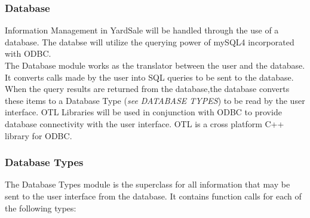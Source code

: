 \documentclass{report}
\begin{document}
            \subsubsection{Database}
                Information Management in YardSale will be handled
                through the use of a database.  The databse will
                utilize the querying power of mySQL4 incorporated
                with ODBC. \\
                The Database module works as the translator between
                the user and the database.  It converts calls
                made by the user into SQL queries to be sent to the
                database.  When the query results are returned from the
                database,the database converts these items to a
                Database Type ({\sl see DATABASE TYPES}) to be read by the
                user interface. OTL Libraries will be used in conjunction with ODBC to
                provide database connectivity with the user interface. OTL is
                a cross platform C++ library for ODBC.

            \subsubsection{Database Types}
                The Database Types module is the superclass for all information that
                may be sent to the user interface from the database.  It contains
                function calls for each of the following types:
\end{document}
